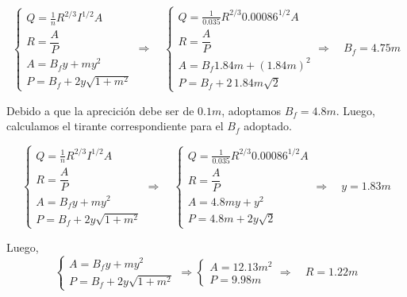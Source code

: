 \begin{equation*}
  \begin{cases}
    Q = \frac{1}{n} R^{2/3} I^{1/2} A \\
    R = \dfrac{A}{P} \\
    A = B_{f}y + m y^{2} \\
    P = B_{f} + 2 y \sqrt{1 + m^{2}}
  \end{cases}
  \Longrightarrow \quad
  \begin{cases}
    Q = \frac{1}{0.035} R^{2/3} 0.00086^{1/2} A \\
    R = \dfrac{A}{P} \\
    A = B_{f}1.84 m + (1.84 m)^2 \\
    P = B_{f} + 2 \, 1.84 m \sqrt{2}
  \end{cases}
  \Longrightarrow \quad
  B_{f} = 4.75 m
\end{equation*}

Debido a que la aprecición debe ser de $0.1 m$, adoptamos $B_{f} = 4.8 m$.
Luego, calculamos el tirante correspondiente para el $B_{f}$ adoptado.

\begin{equation*}
  \begin{cases}
    Q = \frac{1}{n} R^{2/3} I^{1/2} A \\
    R = \dfrac{A}{P} \\
    A = B_{f}y + m y^{2} \\
    P = B_{f} + 2 y \sqrt{1 + m^{2}}
  \end{cases}
  \Longrightarrow \quad
  \begin{cases}
    Q = \frac{1}{0.035} R^{2/3} 0.00086^{1/2} A \\
    R = \dfrac{A}{P} \\
    A = 4.8 m y + y^2 \\
    P = 4.8 m + 2 y \sqrt{2}
  \end{cases}
  \Longrightarrow \quad
  y = 1.83 m
\end{equation*}

Luego,
\begin{equation*}
  \begin{cases}
    A = B_{f}y + m y^{2} \\
    P = B_{f} + 2 y \sqrt{1 + m^{2}}
  \end{cases}
  \Longrightarrow
  \begin{cases}
    A = 12.13 m^2 \\
    P = 9.98 m
  \end{cases}
  \Longrightarrow \quad
  R = 1.22 m
\end{equation*}


